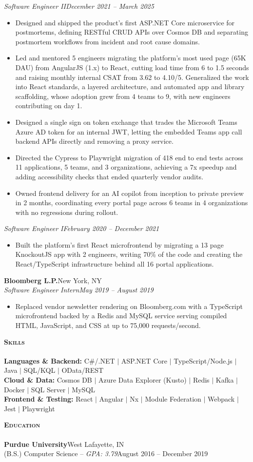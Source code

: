 \documentclass[letterpaper, 10pt]{article}
\newcommand{\lineunder}{
    \vspace*{-8pt} \\
    \hspace*{-18pt} \hrulefill \\
}
\newcommand{\header}[1]{
    \vspace*{10pt}
    {
        \hspace*{-18pt}\vspace*{4pt}
        {\large\textbf{\textsc{#1}}}
    }
    \vspace*{-6pt} \lineunder
}
\newcommand{\role}[2]{
    \Needspace{5\baselineskip}
    \textit{#1}\hfill \textit{#2}\\[-2pt]
}
\newcommand{\experience}[4]{
    \vspace*{6pt}
    \Needspace{5\baselineskip}
    \textbf{#1}\hfill #2\\[-1pt]
    \textit{#3}\hfill \textit{#4}\\[-2pt]
}
\begin{document}
\role{Software Engineer II}{December 2021 -- March 2025}
\begin{itemize}
    \item Designed and shipped the product's first ASP.NET Core microservice for postmortems, defining RESTful CRUD APIs over Cosmos DB and separating postmortem workflows from incident and root cause domains.
    \item Led and mentored 5 engineers migrating the platform's most used page (65K DAU) from AngularJS (1.x) to React, cutting load time from 6 to 1.5 seconds and raising monthly internal CSAT from 3.62 to 4.10/5. Generalized the work into React standards, a layered architecture, and automated app and library scaffolding, whose adoption grew from 4 teams to 9, with new engineers contributing on day 1.
    \item Designed a single sign on token exchange that trades the Microsoft Teams Azure AD token for an internal JWT, letting the embedded Teams app call backend APIs directly and removing a proxy service.
    \item Directed the Cypress to Playwright migration of 418 end to end tests across 11 applications, 5 teams, and 3 organizations, achieving a 7x speedup and adding accessibility checks that ended quarterly vendor audits.
    \item Owned frontend delivery for an AI copilot from inception to private preview in 2 months, coordinating every portal page across 6 teams in 4 organizations with no regressions during rollout.
\end{itemize}

\role{Software Engineer I}{February 2020 -- December 2021}
\begin{itemize}
    \item Built the platform's first React microfrontend by migrating a 13 page KnockoutJS app with 2 engineers, writing 70\% of the code and creating the React/TypeScript infrastructure behind all 16 portal applications.
\end{itemize}

\experience{Bloomberg L.P.}{New York, NY}{Software Engineer Intern}{May 2019 -- August 2019}
\begin{itemize}
    \item Replaced vendor newsletter rendering on Bloomberg.com with a TypeScript microfrontend backed by a Redis and MySQL service serving compiled HTML, JavaScript, and CSS at up to 75,000 requests/second.
\end{itemize}

\header{Skills}
\textbf{Languages \& Backend:} C\#/.NET $\vert$ ASP.NET Core $\vert$ TypeScript/Node.js $\vert$ Java $\vert$ SQL/KQL $\vert$ OData/REST\\
\textbf{Cloud \& Data:} Cosmos DB $\vert$ Azure Data Explorer (Kusto) $\vert$ Redis $\vert$ Kafka $\vert$ Docker $\vert$ SQL Server $\vert$ MySQL\\
\textbf{Frontend \& Testing:} React $\vert$ Angular $\vert$ Nx $\vert$ Module Federation $\vert$ Webpack $\vert$ Jest $\vert$ Playwright

\header{Education}
\textbf{Purdue University}\hfill West Lafayette, IN\\
(B.S.) Computer Science -- \textit{GPA: 3.79}\hfill August 2016 -- December 2019
\end{document}
